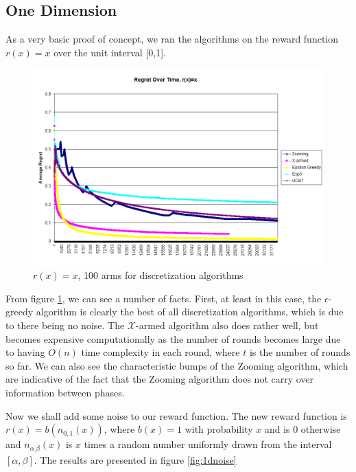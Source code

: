 \subsection{One Dimension}
As a very basic proof of concept, we ran the algorithms on the reward
function $r(x) = x$ over the unit interval [0,1].

\begin{figure}[!ht]
  \begin{center}
    \includegraphics[width=\figwidth]{figures/1dsimpleplot.png}
     \caption{$r(x) = x$, 100 arms for discretization
     algorithms}
     \label{fig:1dsimple}
  \end{center}
\end{figure}

From figure \ref{fig:1dsimple}, we can see a number of facts.  First, at 
least in this case, the $\epsilon$-greedy algorithm is clearly the
best of all discretization algorithms, which is due to there being
no noise.  The $\mathcal{X}$-armed algorithm also does rather well,
but becomes expensive computationally as the number of rounds becomes
large due to having $O(n)$ time complexity in each round, where $t$ is
the number of rounds so far.  We can also see the characteristic bumps of
the Zooming algorithm, which are indicative of the fact that the Zooming
algorithm does not carry over information between phases.

Now we shall add some noise to our reward function.  The new reward
function is $r(x) = b(n_{0,1}(x))$, where $b(x) = 1$ with probability
$x$ and is 0 otherwise and $n_{\alpha_,\beta}(x)$ is $x$ times a random
number uniformly drawn from the interval $[\alpha, \beta]$.  The results
are presented in figure \ref{fig:1dnoise}

